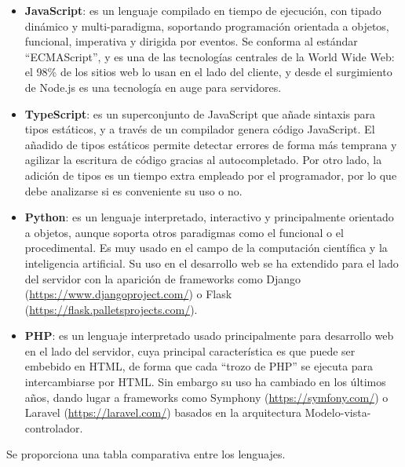 \begin{itemize}
    \item \textbf{JavaScript}: es un lenguaje compilado en tiempo de ejecución, con tipado dinámico y multi-paradigma, soportando programación orientada a objetos, funcional, imperativa y dirigida por eventos\cite{wiki:JavaScript}. Se conforma al estándar ``ECMAScript'', y es una de las tecnologías centrales de la World Wide Web: el 98\% de los sitios web lo usan en el lado del cliente\cite{javascriptUsage}, y desde el surgimiento de Node.js es una tecnología en auge para servidores.
    \item \textbf{TypeScript}: es un superconjunto de JavaScript que añade sintaxis para tipos estáticos, y a través de un compilador genera código JavaScript\cite{typescriptWeb}. El añadido de tipos estáticos permite detectar errores de forma más temprana y agilizar la escritura de código gracias al autocompletado. Por otro lado, la adición de tipos es un tiempo extra empleado por el programador, por lo que debe analizarse si es conveniente su uso o no.
    \item \textbf{Python}: es un lenguaje interpretado, interactivo y principalmente orientado a objetos, aunque soporta otros paradigmas como el funcional o el procedimental\cite{pythonFAQGeneral}. Es muy usado en el campo de la computación científica y la inteligencia artificial. Su uso en el desarrollo web se ha extendido para el lado del servidor con la aparición de frameworks como Django (\url{https://www.djangoproject.com/}) o Flask (\url{https://flask.palletsprojects.com/}).
    \item \textbf{PHP}: es un lenguaje interpretado usado principalmente para desarrollo web en el lado del servidor, cuya principal característica es que puede ser embebido en HTML, de forma que cada ``trozo de PHP'' se ejecuta para intercambiarse por HTML. Sin embargo su uso ha cambiado en los últimos años, dando lugar a frameworks como Symphony (\url{https://symfony.com/}) o Laravel (\url{https://laravel.com/}) basados en la arquitectura Modelo-vista-controlador.
\end{itemize}

Se proporciona una tabla comparativa entre los lenguajes.

